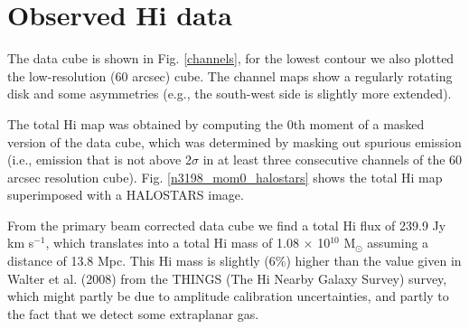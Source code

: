 \documentclass[traditabstract]{aa}
\begin{document}


\section{Observed H{\sc i} data}
\label{sect_observed}

The data cube is shown in Fig. \ref{channels}, for the lowest contour we also
plotted the low-resolution (60 arcsec) cube. The channel maps show a
regularly rotating disk and some asymmetries (e.g., the south-west
side is slightly more extended).

The total H{\sc i} map was obtained by computing the 0th moment of a masked
version of the data cube, which was determined by masking out spurious
emission (i.e., emission that is not above 2$\sigma$ in at least three
consecutive channels of the 60 arcsec resolution
cube). Fig. \ref{n3198_mom0_halostars} shows 
the total H{\sc i} map superimposed with a HALOSTARS image.  

From the primary beam corrected data cube we find a total H{\sc i} flux
of 239.9 Jy km s$^{-1}$, which translates into a total H{\sc i} mass of 1.08
$\times$ 10$^{10}$ M$_{\odot}$
assuming a distance of 13.8 Mpc. This H{\sc i} mass is slightly (6\%) higher
than the value given in Walter et al. (2008) from the THINGS 
(The H{\sc i} Nearby Galaxy Survey) survey, which might partly be
due to amplitude calibration uncertainties, and partly to the fact
that we detect some extraplanar gas.
\end{document}
